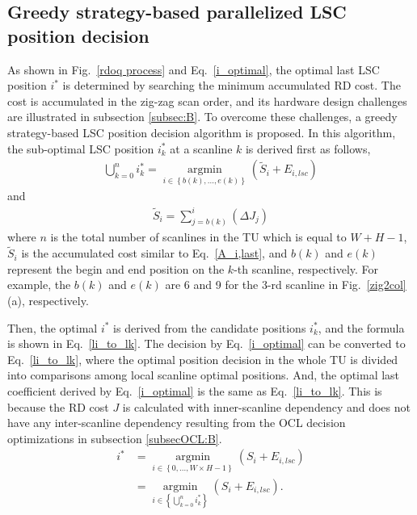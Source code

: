 \documentclass[lettersize,journal]{IEEEtran}
\begin{document}
\subsection{Greedy strategy-based parallelized LSC position decision}
\label{subsecgreedy}
As shown in Fig.~\ref{rdoq process} and Eq.~\eqref{i_optimal}, the optimal last LSC position $i^{*}$ is determined by searching the minimum accumulated RD cost. The cost is accumulated in the zig-zag scan order, and its hardware design challenges are illustrated in subsection \ref{subsec:B}. To overcome these challenges, a greedy strategy-based LSC position decision algorithm is proposed. In this algorithm, the sub-optimal LSC position $i_{k}^{*}$ at a scanline $k$ is derived first as follows, 
\begin{equation}
	\begin{aligned}
		\label{lk_optimal}
		\bigcup_{k=0}^{n} i_{k}^{*} 
		=\mathop{\arg\min}\limits_{i \in \left \{ b(k),...,e(k)\right \} } \left ( \widetilde{S}_{i}+ E_{i,lsc} \right ) 
	\end{aligned}
\end{equation}
and
\begin{equation}
	\begin{aligned}
		\label{S'i,last}
		\widetilde{S}_{i} = \sum_{j=b(k)}^{i}\left ( \Delta J_{j} \right)
	\end{aligned}
\end{equation}
where $n$ is the total number of scanlines in the TU which is equal to $W+H-1$, $\widetilde{S}_{i}$ is the accumulated cost similar to Eq.~\eqref{A_i,last}, and $b(k)$ and $e(k)$ represent the begin and end position on the $k$-th scanline, respectively. For example, the $b(k)$ and $e(k)$ are 6 and 9 for the 3-rd scanline in Fig.~\ref{zig2col}(a), respectively. 
\par
Then, the optimal $i^{*}$ is derived from the candidate positions $i_{k}^{*}$, and the formula is shown in Eq.~\eqref{li_to_lk}. The decision by Eq.~\eqref{i_optimal} can be converted to Eq.~\eqref{li_to_lk}, where the optimal position decision in the whole TU is divided into comparisons among local scanline optimal positions. And, the optimal last coefficient derived by Eq.~\eqref{i_optimal} is the same as Eq.~\eqref{li_to_lk}. This is because the RD cost $J$ is calculated with inner-scanline dependency and does not have any inter-scanline dependency resulting from the OCL decision optimizations in subsection \ref{subsecOCL:B}. 
\begin{equation}
	\begin{aligned}
		\label{li_to_lk}
		i^{*} &=\mathop{\arg\min}\limits_{i \in \left \{  0,...,W \times H - 1 \right \} } \left ( S_{i} + E_{i,lsc}   \right )
		\\&=\mathop{\arg\min}\limits_{i \in \left \{ \bigcup\limits_{k=0}^{n} i_{k}^{*} \right  \} } \left ( S_{i} + E_{i,lsc}   \right ) .
	\end{aligned}
\end{equation}
\end{document}
